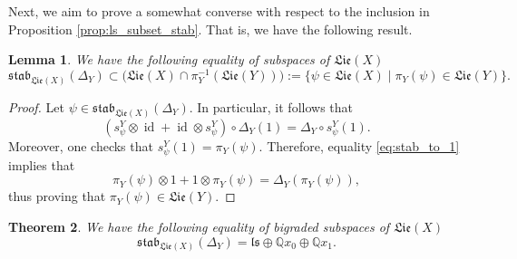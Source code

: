 \documentclass[11pt, a4paper]{amsart}
\newtheorem{theorem}{Theorem}[section]
\newtheorem{lemma}[theorem]{Lemma}
\numberwithin{equation}{section}
\theoremstyle{definition}
\newcommand{\Q}{\mathbb{Q}}
\newcommand{\id}{\operatorname{id}}
\newcommand{\Lie}{\mathfrak{Lie}}
\newcommand{\stab}{\mathfrak{stab}}
\begin{document}
\noindent Next, we aim to prove a somewhat converse with respect to the inclusion in Proposition \ref{prop:ls_subset_stab}. That is, we have the following result.
\begin{lemma} \label{lem:stab_subset_libY} 
    We have the following equality of subspaces of $\Lie(X)$
    \[
        \stab_{\Lie(X)}(\Delta_Y) \subset \Big(\Lie(X) \cap \pi_Y^{-1}(\Lie(Y))\Big) := \{ \psi \in \Lie(X) \mid \pi_Y(\psi) \in \Lie(Y) \}.
    \]
\end{lemma}
\begin{proof}
    Let $\psi \in \stab_{\Lie(X)}(\Delta_Y)$. In particular, it follows that
    \begin{equation} \label{eq:stab_to_1}
        (s^Y_{\psi} \otimes \id + \id \otimes s^Y_{\psi}) \circ \Delta_Y(1) = \Delta_Y \circ s^Y_\psi(1).
    \end{equation}
    Moreover, one checks that $s^Y_\psi(1) = \pi_Y(\psi)$. Therefore, equality \eqref{eq:stab_to_1} implies that
    \[
        \pi_Y(\psi) \otimes 1 + 1 \otimes \pi_Y(\psi) = \Delta_Y(\pi_Y(\psi)), 
    \]
    thus proving that $\pi_Y(\psi) \in \Lie(Y)$.
\end{proof}

\begin{theorem} \label{thm:stab_equals_ls}
    We have the following equality of bigraded subspaces of $\Lie(X)$
    \[
        \stab_{\Lie(X)}(\Delta_Y) = \mathfrak{ls} \oplus \Q x_0 \oplus \Q x_1.
    \]
\end{theorem}
\end{document}
